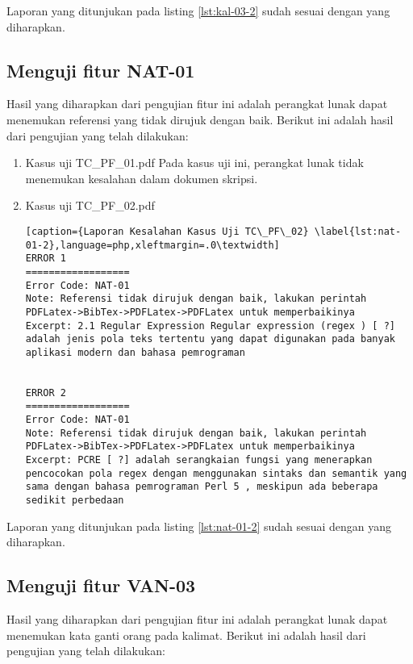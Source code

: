 Laporan yang ditunjukan pada listing \ref{lst:kal-03-2} sudah sesuai dengan yang diharapkan.

\subsection{Menguji fitur NAT-01}
Hasil yang diharapkan dari pengujian fitur ini adalah perangkat lunak dapat menemukan referensi yang tidak dirujuk dengan baik. Berikut ini adalah hasil dari pengujian yang telah dilakukan:

\begin{enumerate}
	\item Kasus uji TC\_PF\_01.pdf
	Pada kasus uji ini, perangkat lunak tidak menemukan kesalahan dalam dokumen skripsi.
	
	\item Kasus uji TC\_PF\_02.pdf
	
\begin{lstlisting}[caption={Laporan Kesalahan Kasus Uji TC\_PF\_02}	\label{lst:nat-01-2},language=php,xleftmargin=.0\textwidth]
ERROR 1
==================
Error Code: NAT-01
Note: Referensi tidak dirujuk dengan baik, lakukan perintah PDFLatex->BibTex->PDFLatex->PDFLatex untuk memperbaikinya
Excerpt: 2.1 Regular Expression Regular expression (regex ) [ ?] adalah jenis pola teks tertentu yang dapat digunakan pada banyak aplikasi modern dan bahasa pemrograman


ERROR 2
==================
Error Code: NAT-01
Note: Referensi tidak dirujuk dengan baik, lakukan perintah PDFLatex->BibTex->PDFLatex->PDFLatex untuk memperbaikinya
Excerpt: PCRE [ ?] adalah serangkaian fungsi yang menerapkan pencocokan pola regex dengan menggunakan sintaks dan semantik yang sama dengan bahasa pemrograman Perl 5 , meskipun ada beberapa sedikit perbedaan
\end{lstlisting}
\end{enumerate}

Laporan yang ditunjukan pada listing \ref{lst:nat-01-2} sudah sesuai dengan yang diharapkan.

\subsection{Menguji fitur VAN-03}
Hasil yang diharapkan dari pengujian fitur ini adalah perangkat lunak dapat menemukan kata ganti orang pada kalimat. Berikut ini adalah hasil dari pengujian yang telah dilakukan:

